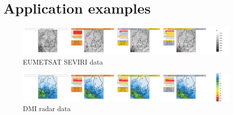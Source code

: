 \documentclass[11pt,a4paper]{article}
\begin{document}
\section{Application examples}



\begin{figure}[htbp]
    \centering
    \includegraphics[width=1.2\textwidth]{../PLOTS/panel_IR_108_202401022300+23}
    \caption{EUMETSAT SEVIRI data}
    \label{fig:IRexample}
\end{figure}

\begin{figure}[htbp]
    \centering
    \includegraphics[width=1.2\textwidth]{../PLOTS/panel_Accpcp3h_202401030000+24.png}
    \caption{DMI radar data}
    \label{fig:TPexample1}
\end{figure}
%
%
%
\end{document}
